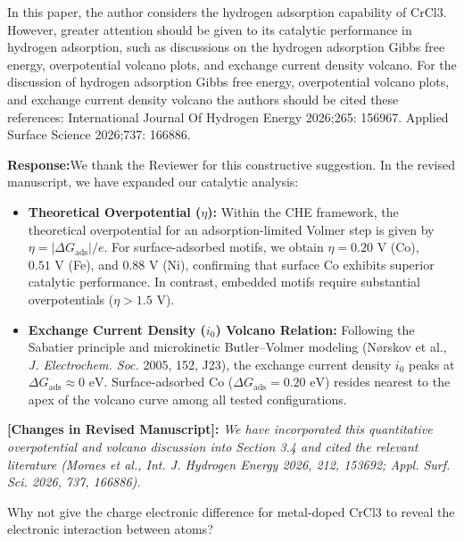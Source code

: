 \documentclass[11pt, sans, a4paper]{moderncv}
\newcommand{\response}{\vspace{0.4em}\noindent\textbf{\color{actionblue}Response:}\hspace{0.5em}}
\newcommand{\manuscriptchange}[1]{\vspace{0.3em}\noindent\textbf{\color{acsblue}[Changes in Revised Manuscript]:} \textit{#1}\vspace{0.4em}}
\begin{document}
\begin{reviewercomment}
In this paper, the author considers the hydrogen adsorption capability of CrCl3. However, greater attention should be given to its catalytic performance in hydrogen adsorption, such as discussions on the hydrogen adsorption Gibbs free energy, overpotential volcano plots, and exchange current density volcano. For the discussion of hydrogen adsorption Gibbs free energy, overpotential volcano plots, and exchange current density volcano the authors should be cited these references: International Journal Of Hydrogen Energy 2026;265: 156967. Applied Surface Science 2026;737: 166886.
\end{reviewercomment}

\response We thank the Reviewer for this constructive suggestion. In the revised manuscript, we have expanded our catalytic analysis:
\begin{itemize}[leftmargin=1.5em, itemsep=0.2em]
    \item \textbf{Theoretical Overpotential ($\eta$):} Within the CHE framework, the theoretical overpotential for an adsorption-limited Volmer step is given by $\eta = |\Delta G_{\mathrm{ads}}|/e$. For surface-adsorbed motifs, we obtain $\eta = 0.20\text{ V}$ (Co), $0.51\text{ V}$ (Fe), and $0.88\text{ V}$ (Ni), confirming that surface Co exhibits superior catalytic performance. In contrast, embedded motifs require substantial overpotentials ($\eta > 1.5\text{ V}$).
    \item \textbf{Exchange Current Density ($i_0$) Volcano Relation:} Following the Sabatier principle and microkinetic Butler--Volmer modeling (N{\o}rskov et al., \textit{J. Electrochem. Soc.} 2005, 152, J23), the exchange current density $i_0$ peaks at $\Delta G_{\mathrm{ads}} \approx 0\text{ eV}$. Surface-adsorbed Co ($\Delta G_{\mathrm{ads}} = 0.20\text{ eV}$) resides nearest to the apex of the volcano curve among all tested configurations.
\end{itemize}

\manuscriptchange{We have incorporated this quantitative overpotential and volcano discussion into Section 3.4 and cited the relevant literature (Moraes et al., \textit{Int. J. Hydrogen Energy} 2026, 212, 153692; \textit{Appl. Surf. Sci.} 2026, 737, 166886).}

\begin{reviewercomment}
Why not give the charge electronic difference for metal-doped CrCl3 to reveal the electronic interaction between atoms?
\end{reviewercomment}
\end{document}
